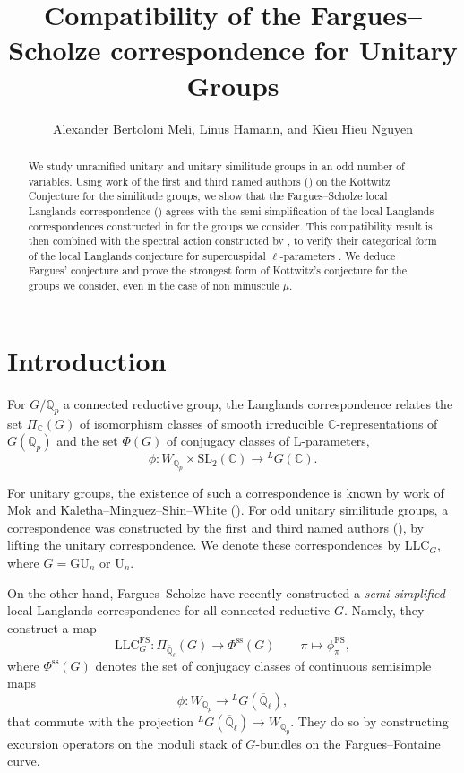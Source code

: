 \documentclass[reqno,11pt]{amsart}
\title{Compatibility of the Fargues--Scholze correspondence for Unitary Groups}
\author{Alexander Bertoloni Meli, Linus Hamann, and Kieu Hieu Nguyen}
\theoremstyle{remark}
\newcommand{\GU}{\mathrm{GU}}
\newcommand{\U}{\mathrm{U}}
\newcommand{\C}{\mathbb{C}}
\newcommand{\Q}{\mathbb{Q}}
\newcommand{\ov}{\overline}
\newcommand{\SL}{\mathrm{SL}}
\newcommand{\LLC}{\mathrm{LLC}}
\begin{document}
\maketitle
\begin{abstract} 
We study unramified unitary and unitary similitude groups in an odd number of variables. Using work of the first and third named authors (\cite{BMN}) on the Kottwitz Conjecture for the similitude groups, we show that the Fargues--Scholze local Langlands correspondence (\cite{FS}) agrees with the semi-simplification of the local Langlands correspondences constructed in \cite{Mok,KMSW,BMN} for the groups we consider. This compatibility result is then combined with the spectral action constructed by \cite[Chapter~X]{FS}, to verify their categorical form of the local Langlands conjecture for supercuspidal $\ell$-parameters \cite[Conjecture~X.2.2]{FS}. We deduce Fargues' conjecture \cite[Conjecture~4.1]{Fa} and prove the strongest form of Kottwitz's conjecture \cite[Conjecture~I.0.1]{HKW} for the groups we consider, even in the case of non minuscule $\mu$.
\end{abstract}
\section{Introduction}{\label{s: intro}}
For $G/\Q_p$ a connected reductive group, the Langlands correspondence relates the set $\Pi_{\C}(G)$ of isomorphism classes of smooth irreducible $\C$-representations of $G(\Q_p)$ and the set $\Phi(G)$ of conjugacy classes  of L-parameters, 
\[ \phi: W_{\mathbb{Q}_{p}} \times \SL_{2}(\mathbb{C}) \rightarrow \phantom{}^{L}G(\mathbb{C}). \]

For unitary groups, the existence of such a correspondence is known by work of Mok \cite[Theorem~1.5]{Mok} and Kaletha--Minguez--Shin--White (\cite[Theorem 1.6.1]{KMSW}). For odd unitary similitude groups, a correspondence was constructed by the first and third named authors (\cite[Theorem~1.2]{BMN}), by lifting the unitary correspondence. We denote these correspondences by $\LLC_G$, where $G=\GU_n$ or $\U_n$.

On the other hand, Fargues--Scholze \cite{FS} have recently constructed a \emph{semi-simplified} local Langlands correspondence for all connected reductive $G$. Namely, they construct a map
\[ \LLC_{G}^{\mathrm{FS}}: \Pi_{\ov{\Q}_{\ell}}(G) \rightarrow \Phi^{\mathrm{ss}}(G) \quad \quad \pi \mapsto \phi_{\pi}^{\mathrm{FS}},  \]
where $\Phi^{\mathrm{ss}}(G)$ denotes the set of conjugacy classes of continuous semisimple maps
\[ \phi: W_{\mathbb{Q}_{p}} \rightarrow \phantom{}^{L}G(\overline{\mathbb{Q}}_{\ell}), \]
that commute with the projection $\phantom{}^{L}G(\overline{\mathbb{Q}}_{\ell}) \rightarrow W_{\Q_p}$. They do so by constructing excursion operators on the moduli stack of $G$-bundles on the Fargues--Fontaine curve. 
\end{document}
